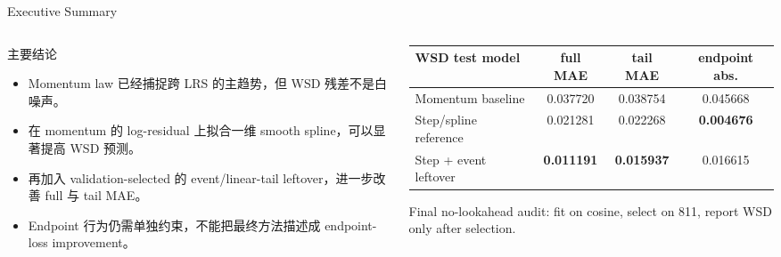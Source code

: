 \documentclass[fontset=fandol,aspectratio=169,10pt]{ctexbeamer}
\newcommand{\smallnote}[1]{{\scriptsize\color{tdltGray}#1}}
\begin{document}
\begin{frame}{Executive Summary}
  \begin{columns}[T,onlytextwidth]
    \begin{column}{0.52\textwidth}
      \begin{block}{主要结论}
        \begin{itemize}
          \item Momentum law 已经捕捉跨 LRS 的主趋势，但 WSD 残差不是白噪声。
          \item 在 momentum 的 log-residual 上拟合一维 smooth spline，可以显著提高 WSD 预测。
          \item 再加入 validation-selected 的 event/linear-tail leftover，进一步改善 full 与 tail MAE。
          \item Endpoint 行为仍需单独约束，不能把最终方法描述成 endpoint-loss improvement。
        \end{itemize}
      \end{block}
    \end{column}
    \begin{column}{0.46\textwidth}
      \begin{table}
        \centering
        \scriptsize
        \begin{tabular}{lccc}
          \toprule
          WSD test model & full MAE & tail MAE & endpoint abs.\\
          \midrule
          Momentum baseline & 0.037720 & 0.038754 & 0.045668\\
          Step/spline reference & 0.021281 & 0.022268 & \textbf{0.004676}\\
          Step + event leftover & \textbf{0.011191} & \textbf{0.015937} & 0.016615\\
          \bottomrule
        \end{tabular}
      \end{table}
      \smallnote{Final no-lookahead audit: fit on cosine, select on 811, report WSD only after selection.}
    \end{column}
  \end{columns}
\end{frame}
\end{document}
